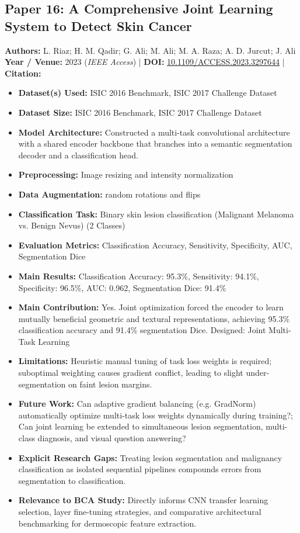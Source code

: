 \documentclass[11pt,a4paper]{article}
\begin{document}
\subsection{Paper 16: A Comprehensive Joint Learning System to Detect Skin Cancer}
\textbf{Authors:} L. Riaz; H. M. Qadir; G. Ali; M. Ali; M. A. Raza; A. D. Jurcut; J. Ali \\
\textbf{Year / Venue:} 2023 (\textit{IEEE Access}) | \textbf{DOI:} \href{https://doi.org/10.1109/ACCESS.2023.3297644}{10.1109/ACCESS.2023.3297644} | \textbf{Citation:} \cite{10189856}

\begin{itemize}\small
\item \textbf{Dataset(s) Used:} ISIC 2016 Benchmark, ISIC 2017 Challenge Dataset
\item \textbf{Dataset Size:} ISIC 2016 Benchmark, ISIC 2017 Challenge Dataset
\item \textbf{Model Architecture:} Constructed a multi-task convolutional architecture with a shared encoder backbone that branches into a semantic segmentation decoder and a classification head.
\item \textbf{Preprocessing:} Image resizing and intensity normalization
\item \textbf{Data Augmentation:} random rotations and flips
\item \textbf{Classification Task:} Binary skin lesion classification (Malignant Melanoma vs. Benign Nevus) (2 Classes)
\item \textbf{Evaluation Metrics:} Classification Accuracy, Sensitivity, Specificity, AUC, Segmentation Dice
\item \textbf{Main Results:} Classification Accuracy: 95.3\%, Sensitivity: 94.1\%, Specificity: 96.5\%, AUC: 0.962, Segmentation Dice: 91.4\%
\item \textbf{Main Contribution:} Yes. Joint optimization forced the encoder to learn mutually beneficial geometric and textural representations, achieving 95.3\% classification accuracy and 91.4\% segmentation Dice. Designed: Joint Multi-Task Learning
\item \textbf{Limitations:} Heuristic manual tuning of task loss weights is required; suboptimal weighting causes gradient conflict, leading to slight under-segmentation on faint lesion margins.
\item \textbf{Future Work:} Can adaptive gradient balancing (e.g. GradNorm) automatically optimize multi-task loss weights dynamically during training?; Can joint learning be extended to simultaneous lesion segmentation, multi-class diagnosis, and visual question answering?
\item \textbf{Explicit Research Gaps:} Treating lesion segmentation and malignancy classification as isolated sequential pipelines compounds errors from segmentation to classification.
\item \textbf{Relevance to BCA Study:} Directly informs CNN transfer learning selection, layer fine-tuning strategies, and comparative architectural benchmarking for dermoscopic feature extraction.
\end{itemize}
\end{document}
